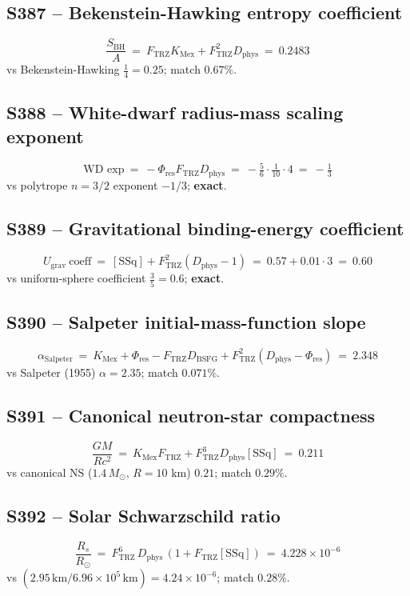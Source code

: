 \documentclass[11pt]{article}
\newcommand{\Ftrz}{F_{\mathrm{TRZ}}}
\newcommand{\Phires}{\Phi_{\mathrm{res}}}
\newcommand{\KMex}{K_{\mathrm{Mex}}}
\newcommand{\Dphys}{D_{\mathrm{phys}}}
\newcommand{\Dbsfg}{D_{\mathrm{BSFG}}}
\newcommand{\SSq}{[\mathrm{SSq}]}
\begin{document}
\subsection{S387 -- Bekenstein-Hawking entropy coefficient}
\[
\frac{S_{\text{BH}}}{A}\ =\ \Ftrz\KMex+\Ftrz^{2}\Dphys\ =\ 0.2483
\]
vs Bekenstein-Hawking $\tfrac{1}{4}=0.25$; match $0.67\%$.

\subsection{S388 -- White-dwarf radius-mass scaling exponent}
\[
\text{WD exp}\ =\ -\Phires\Ftrz\Dphys\ =\ -\tfrac{5}{6}\cdot\tfrac{1}{10}\cdot 4\ =\ -\tfrac{1}{3}
\]
vs polytrope $n=3/2$ exponent $-1/3$; \textbf{exact}.

\subsection{S389 -- Gravitational binding-energy coefficient}
\[
U_{\text{grav}}\ \text{coeff}\ =\ \SSq+\Ftrz^{2}(\Dphys-1)\ =\ 0.57+0.01\cdot 3\ =\ 0.60
\]
vs uniform-sphere coefficient $\tfrac{3}{5}=0.6$; \textbf{exact}.

\subsection{S390 -- Salpeter initial-mass-function slope}
\[
\alpha_{\text{Salpeter}}\ =\ \KMex+\Phires-\Ftrz\Dbsfg+\Ftrz^{2}(\Dphys-\Phires)\ =\ 2.348
\]
vs Salpeter (1955) $\alpha=2.35$; match $0.071\%$.

\subsection{S391 -- Canonical neutron-star compactness}
\[
\frac{GM}{Rc^{2}}\ =\ \KMex\Ftrz+\Ftrz^{3}\Dphys\SSq\ =\ 0.211
\]
vs canonical NS ($1.4\,M_\odot$, $R=10$ km) $0.21$; match $0.29\%$.

\subsection{S392 -- Solar Schwarzschild ratio}
\[
\frac{R_s}{R_\odot}\ =\ \Ftrz^{6}\,\Dphys\,(1+\Ftrz\SSq)\ =\ 4.228\times10^{-6}
\]
vs $(2.95\,\text{km}/6.96\times10^{5}\,\text{km})=4.24\times10^{-6}$;
match $0.28\%$.
\end{document}

